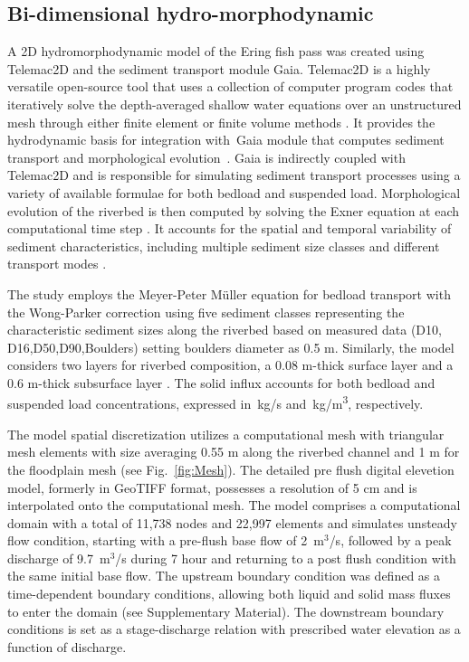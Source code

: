 \documentclass[draft,linenumbers,onecolumn]{agujournal2019} %
\begin{document}
\subsection{Bi-dimensional hydro-morphodynamic}
\label{sec:Sec2.2}
A 2D hydromorphodynamic model of the Ering fish pass was created using Telemac2D and the sediment transport module Gaia. Telemac2D is a  highly versatile open-source tool that uses a collection of computer program codes that iteratively solve the depth-averaged shallow water equations \cite{saint-venant1871theorie} over an unstructured mesh through either finite element or finite volume methods \cite{galland1991telemac,hervouet2007hydrodynamics}. It provides the hydrodynamic basis for integration with Gaia module that computes sediment transport and morphological evolution \cite{tassi2023gaia}. Gaia is indirectly coupled with Telemac2D and is responsible for simulating sediment transport processes using a variety of available formulae for both bedload and suspended load. Morphological evolution of the riverbed is then computed by solving the Exner equation at each computational time step \cite{audouin2020introducing}. It accounts for the spatial and temporal variability of sediment characteristics, including multiple sediment size classes and different transport modes \cite{exner1925uber,tassi2023gaia}. 

The study employs the Meyer-Peter Müller equation for bedload transport with the Wong-Parker correction \cite{wong2006reanalysis} using five sediment classes representing the characteristic sediment sizes along the riverbed based on measured data (D10, D16,D50,D90,Boulders) setting boulders diameter as 0.5 m. Similarly, the model considers two layers for riverbed composition, a 0.08 m-thick surface layer and a 0.6 m-thick subsurface layer \cite{scolari2025hydromorphodynamic}. The solid influx accounts for both bedload and suspended load concentrations, expressed in~kg/s and~kg/m\textsuperscript{3}, respectively.

The model spatial discretization utilizes a computational mesh with triangular mesh elements with size averaging 0.55 m along the riverbed channel and 1 m for the floodplain mesh (see Fig.~\ref{fig:Mesh}). The detailed pre flush digital elevetion model, formerly in GeoTIFF format, possesses a resolution of 5 cm and is interpolated onto the computational mesh. The model comprises a computational domain with a total of 11,738 nodes and 22,997 elements and simulates unsteady flow condition, starting with a pre-flush base flow of 2~m$^3$/s, followed by a peak discharge of 9.7~m$^3$/s during 7 hour and returning to a post flush condition with the same initial base flow. The upstream boundary condition was defined as a time-dependent boundary conditions, allowing both liquid and solid mass fluxes to enter the domain (see Supplementary Material). 
The downstream boundary conditions is set as a stage-discharge relation with prescribed water elevation as a function of discharge. 
\end{document}
